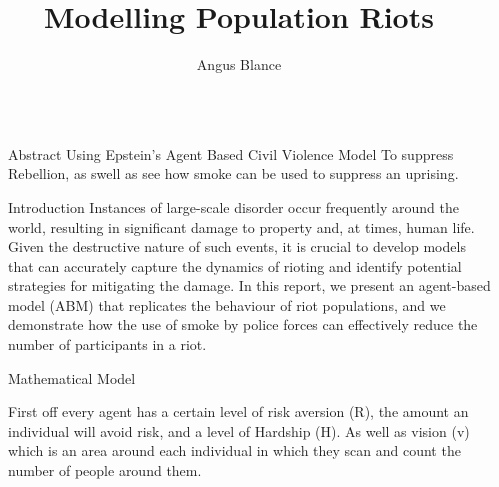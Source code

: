 \documentclass[final,hyperref={pdfpagelabels=false}]{beamer}
\title{\Huge Modelling Population Riots} %
\author{Angus Blance}
\institute{University of Dundee}
\newcommand{\shrink}{-15pt}
\begin{document}
	
	\begin{frame}[t] %
		
		\begin{columns}[t] %
				
				\begin{column}{.03\textwidth}\end{column} %
				
				
				\begin{column}{.32\textwidth} %
					
					\vspace{\shrink}          
					\begin{block}{Abstract}
						Using Epstein's Agent Based Civil Violence Model To suppress Rebellion, as swell as see how smoke can be used to suppress an uprising. 
					\end{block}
					
					\begin{block}{Introduction}
						Instances of large-scale disorder occur frequently around the world,
						resulting in significant damage to property and, at times, human
						life. Given the destructive nature of such events, it is crucial to
						develop models that can accurately capture the dynamics of rioting and identify potential strategies for mitigating the damage. In
						this report, we present an agent-based model (ABM) that replicates the behaviour of riot populations, and we demonstrate how
						the use of smoke by police forces can effectively reduce the number
						of participants in a riot.
					\end{block}
				
					\begin{block}{Mathematical Model}
						
						First off every agent has a certain level of risk aversion (R), the amount an individual will avoid risk, and a level of Hardship (H). As well as vision (v) which is an area around each individual in which they scan and count the number of people around them. \\
						

\end{block}
\end{column}
\end{columns}
\end{frame}
\end{document}
